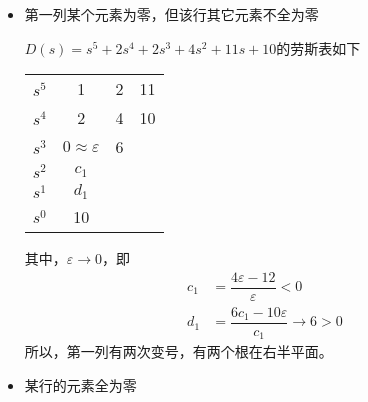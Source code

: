 \begin{itemize}
	\item 第一列某个元素为零，但该行其它元素不全为零

\examples $D(s) = s^5+2s^4 + 2s^3 + 4s^2 +11s+10$的劳斯表如下
\begin{center}
	\begin{tabular}{cccc}
		$s^5$ & 1 & 2 & 11 \\
		$s^4$ & 2 &4 & 10 \\
		$s^3$ & $0 \approx \varepsilon$ &6 &\\
		$s^2$ & $c_1$ &&\\
		$s^1$ & $d_1$ &&\\
		$s^0$ & 10 &&\\
	\end{tabular}
\end{center}
其中，$\varepsilon \to 0 $，即
\begin{align}
	c_1 &= \dfrac{4 \varepsilon - 12}{\varepsilon} < 0\\
	d_1 &= \dfrac{6 c_1 - 10\varepsilon}{c_1} \to 6 >0 
\end{align}
所以，第一列有两次变号，有两个根在右半平面。
	\item 某行的元素全为零


\end{itemize}
